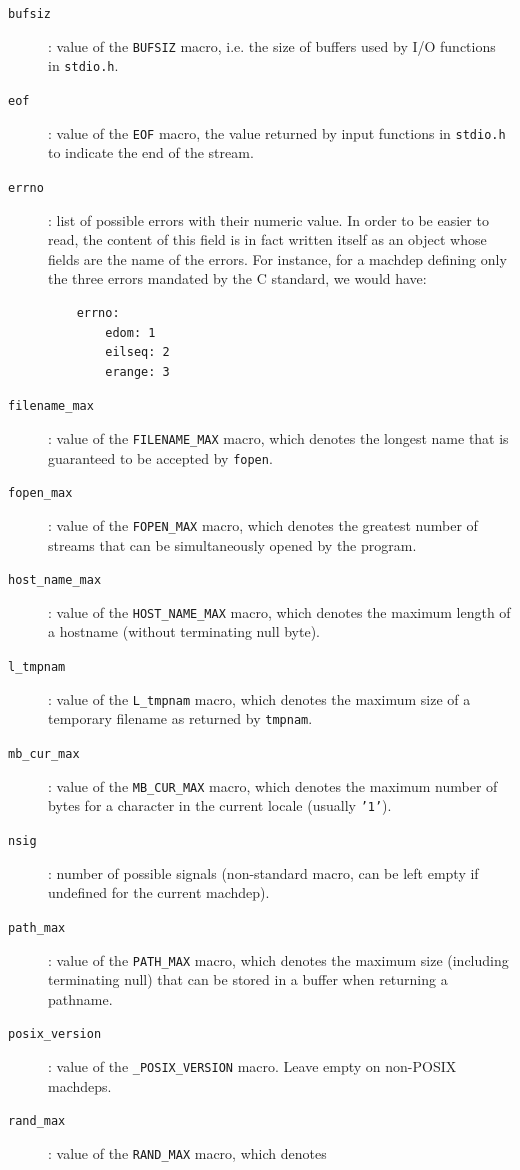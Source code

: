 \begin{description}
  \item[\texttt{bufsiz}]: value of the \texttt{BUFSIZ} macro, i.e. the size
    of buffers used by I/O functions in \texttt{stdio.h}.
  \item[\texttt{eof}]: value of the \texttt{EOF} macro, the value returned by input
    functions in \texttt{stdio.h} to indicate the end of the stream.
  \item[\texttt{errno}]: list of possible errors with their numeric value. In order
    to be easier to read, the content of this field is in fact written itself as an
    object whose fields are the name of the errors. For instance, for a machdep defining
    only the three errors mandated by the C standard, we would have:
    \begin{verbatim}
    errno:
        edom: 1
        eilseq: 2
        erange: 3
    \end{verbatim}
  \item[\texttt{filename\_max}]: value of the \texttt{FILENAME\_MAX} macro, which
    denotes the longest name that is guaranteed to be accepted by \texttt{fopen}.
  \item[\texttt{fopen\_max}]: value of the \texttt{FOPEN\_MAX} macro, which denotes the
    greatest number of streams that can be simultaneously opened by the program.
  \item[\texttt{host\_name\_max}]: value of the \texttt{HOST\_NAME\_MAX} macro, which
    denotes the maximum length of a hostname (without terminating null byte).
  \item[\texttt{l\_tmpnam}]: value of the \texttt{L\_tmpnam} macro, which denotes
    the maximum size of a temporary filename as returned by \texttt{tmpnam}.
  \item[\texttt{mb\_cur\_max}]: value of the \texttt{MB\_CUR\_MAX} macro, which denotes
    the maximum number of bytes for a character in the current locale (usually
    \texttt{'1'}).
  \item[\texttt{nsig}]: number of possible signals (non-standard macro, can be left
    empty if undefined for the current machdep).
  \item[\texttt{path\_max}]: value of the \texttt{PATH\_MAX} macro, which denotes
    the maximum size (including terminating null) that can be stored in a buffer
    when returning a pathname.
  \item[\texttt{posix\_version}]: value of the \texttt{\_POSIX\_VERSION} macro.
    Leave empty on non-POSIX machdeps.
  \item[\texttt{rand\_max}]: value of the \texttt{RAND\_MAX} macro, which denotes

\end{description}
